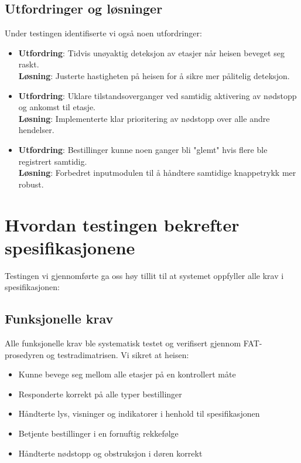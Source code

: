 \subsection{Utfordringer og løsninger}
Under testingen identifiserte vi også noen utfordringer:

\begin{itemize}
    \item \textbf{Utfordring}: Tidvis unøyaktig deteksjon av etasjer når heisen beveget seg raskt.\\
    \textbf{Løsning}: Justerte hastigheten på heisen for å sikre mer pålitelig deteksjon.
    
    \item \textbf{Utfordring}: Uklare tilstandsoverganger ved samtidig aktivering av nødstopp og ankomst til etasje.\\
    \textbf{Løsning}: Implementerte klar prioritering av nødstopp over alle andre hendelser.
    
    \item \textbf{Utfordring}: Bestillinger kunne noen ganger bli "glemt" hvis flere ble registrert samtidig.\\
    \textbf{Løsning}: Forbedret inputmodulen til å håndtere samtidige knappetrykk mer robust.
\end{itemize}

\section{Hvordan testingen bekrefter spesifikasjonene}
Testingen vi gjennomførte ga oss høy tillit til at systemet oppfyller alle krav i spesifikasjonen:

\subsection{Funksjonelle krav}
Alle funksjonelle krav ble systematisk testet og verifisert gjennom FAT-prosedyren og testradimatrisen. Vi sikret at heisen:

\begin{itemize}
    \item Kunne bevege seg mellom alle etasjer på en kontrollert måte
    \item Responderte korrekt på alle typer bestillinger
    \item Håndterte lys, visninger og indikatorer i henhold til spesifikasjonen
    \item Betjente bestillinger i en fornuftig rekkefølge
    \item Håndterte nødstopp og obstruksjon i døren korrekt
\end{itemize}

